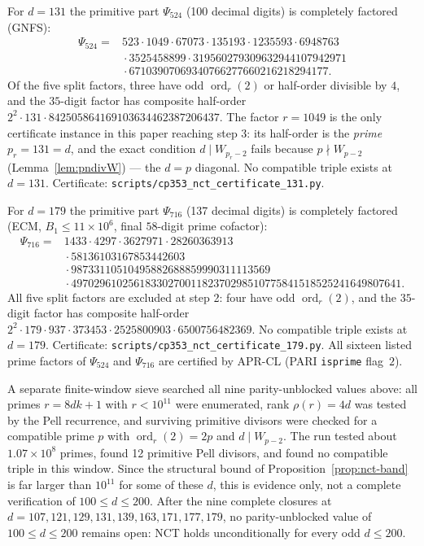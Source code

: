 \documentclass[11pt]{amsart}
\theoremstyle{plain}
\theoremstyle{definition}
\theoremstyle{remark}
\numberwithin{equation}{section}
\newcommand{\ord}{\operatorname{ord}}
\begin{document}
For $d=131$ the primitive part $\Psi_{524}$ (100 decimal digits) is completely factored (GNFS):
\[
\begin{aligned}
  \Psi_{524}={}&523\cdot1049\cdot67073\cdot135193\cdot1235593\cdot6948763\\
  &{}\cdot3525458899\cdot319560279309632944107942971\\
  &{}\cdot67103907069340766277660216218294177.
\end{aligned}
\]
Of the five split factors, three have odd $\ord_r(2)$ or half-order divisible by $4$, and the $35$-digit factor has composite half-order $2^2\cdot131\cdot842505864169103634462387206437$. The factor $r=1049$ is the only certificate instance in this paper reaching step 3: its half-order is the \emph{prime} $p_r=131=d$, and the exact condition $d \mid W_{p_r-2}$ fails because $p \nmid W_{p-2}$ (Lemma~\ref{lem:pndivW}) --- the $d = p$ diagonal. No compatible triple exists at $d=131$. Certificate: \texttt{scripts/}\allowbreak\texttt{cp353\_nct\_certificate\_131.py}.

For $d=179$ the primitive part $\Psi_{716}$ (137 decimal digits) is completely factored (ECM, $B_1 \leq 11{\times}10^6$, final $58$-digit prime cofactor):
\[
\begin{aligned}
  \Psi_{716}={}&1433\cdot4297\cdot3627971\cdot28260363913\\
  &{}\cdot58136103167853442603\\
  &{}\cdot98733110510495882688859990311113569\\
  &{}\cdot4970296102561833027001182370298510775841518525241649807641.
\end{aligned}
\]
All five split factors are excluded at step 2: four have odd $\ord_r(2)$, and the $35$-digit factor has composite half-order $2^2\cdot179\cdot937\cdot373453\cdot2525800903\cdot6500756482369$. No compatible triple exists at $d=179$. Certificate: \texttt{scripts/}\allowbreak\texttt{cp353\_nct\_certificate\_179.py}. All sixteen listed prime factors of $\Psi_{524}$ and $\Psi_{716}$ are certified by APR-CL (PARI \texttt{isprime} flag~$2$).

A separate finite-window sieve searched all nine parity-unblocked values above: all primes $r=8dk+1$ with $r<10^{11}$ were enumerated, rank $\rho(r)=4d$ was tested by the Pell recurrence, and surviving primitive divisors were checked for a compatible prime $p$ with $\ord_r(2)=2p$ and $d\mid W_{p-2}$. The run tested about $1.07\times10^8$ primes, found 12 primitive Pell divisors, and found no compatible triple in this window. Since the structural bound of Proposition~\ref{prop:nct-band} is far larger than $10^{11}$ for some of these $d$, this is evidence only, not a complete verification of $100\leq d\leq200$. After the nine complete closures at $d=107,121,129,131,139,163,171,177,179$, no parity-unblocked value of $100 \leq d \leq 200$ remains open: NCT holds unconditionally for every odd $d \leq 200$.
\end{document}
